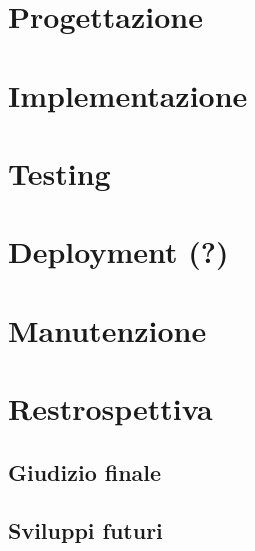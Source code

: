\documentclass[a4paper,12pt]{report}
\begin{document}
\chapter{Progettazione}

\chapter{Implementazione}

\chapter{Testing} 

\chapter{Deployment (?)}

\chapter{Manutenzione}

\chapter{Restrospettiva}
\section{Giudizio finale}
\section{Sviluppi futuri}

 
\end{document}
